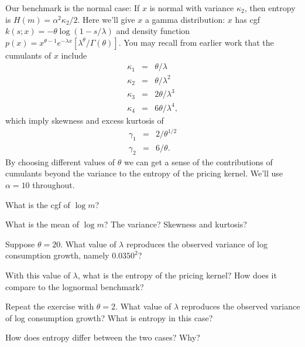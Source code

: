 \documentclass[11pt]{exam}
\begin{document}
\begin{questions}
Our benchmark is the normal case:
If $x$ is normal with variance $\kappa_2$,
then entropy is $ H(m) = \alpha^2 \kappa_2/2 $.
Here we'll give $x$ a gamma distribution:
 $x$ has
cgf $ k(s; x) = - \theta \log (1-s/\lambda) $
and
density function $p(x) = x^{\theta-1} e^{-\lambda x} [\lambda^\theta/\Gamma(\theta)] $.
You may recall from earlier work that the cumulants of $x$ include
\begin{eqnarray*}
    \kappa_1 &=& \theta /\lambda \\
    \kappa_2 &=& \theta /\lambda^2 \\
    \kappa_3 &=& 2 \theta /\lambda^3 \\
    \kappa_4 &=& 6 \theta /\lambda^4 ,
\end{eqnarray*}
which imply skewness and excess kurtosis of
\begin{eqnarray*}
    \gamma_1 &=& 2/\theta^{1/2} \\
    \gamma_2 &=& 6/\theta .
\end{eqnarray*}
By choosing different values of $\theta$ we can get a sense of the contributions
of cumulants beyond the variance to the entropy of the pricing kernel.
We'll use $\alpha = 10$ throughout.
%
\begin{parts}
\item What is the cgf of $\log m$?
\item What is the mean of $\log m$?  The variance?
Skewness and kurtosis?
\item Suppose $\theta = 20$.
What value of $\lambda $ reproduces the observed variance of
log consumption growth, namely $0.0350^2$?
\item With this value of $\lambda$, what is the entropy
of the pricing kernel?
How does it compare to the lognormal benchmark?
\item Repeat the exercise with $\theta = 2$.
What value of $\lambda$ reproduces the observed variance of log consumption growth?
What is entropy in this case?
\item How does entropy differ between the two cases?  Why?
\end{parts}


\end{questions}
\end{document}
